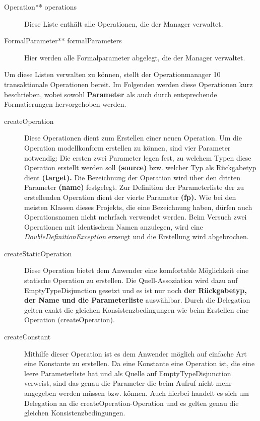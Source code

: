 \begin{description}
\item[Operation** operations] Diese Liste enthält alle Operationen, die der Manager verwaltet.
\item[FormalParameter** formalParameters] Hier werden alle Formalparameter abgelegt, die der Manager verwaltet.
\end{description}

Um diese Listen verwalten zu können, stellt der Operationmanager 10 transaktionale Operationen bereit.
Im Folgenden werden diese Operationen kurz beschrieben, wobei sowohl \textbf{Parameter} als auch  durch entsprechende Formatierungen hervorgehoben werden.

\begin{description}
\item[createOperation]
Diese Operationen dient zum Erstellen einer neuen Operation. Um die Operation modellkonform erstellen zu können, sind vier Parameter notwendig:
Die ersten zwei Parameter legen fest, zu welchem Typen diese Operation erstellt werden soll \textbf{(source)} bzw. welcher Typ als Rückgabetyp dient \textbf{(target).}
Die Bezeichnung der Operation wird über den dritten Parameter \textbf{(name)} festgelegt. 
Zur Definition der Parameterliste der zu erstellenden Operation dient der vierte Parameter \textbf{(fp).}
Wie bei den meisten Klassen dieses Projekts, die eine Bezeichnung haben, dürfen auch Operationsnamen nicht mehrfach verwendet werden. Beim Versuch zwei Operationen mit identischem Namen anzulegen, wird eine \emph{DoubleDefinitionException} erzeugt und die Erstellung wird abgebrochen.
\item[createStaticOperation]
Diese Operation bietet dem Anwender eine komfortable Möglichkeit eine statische Operation zu erstellen. Die Quell-Assoziation wird dazu auf EmptyTypeDisjunction gesetzt und es ist nur noch \textbf{der Rückgabetyp, der Name und die Parameterliste} auswählbar. Durch die Delegation gelten exakt die gleichen Konsistenzbedingungen wie beim Erstellen eine Operation (createOperation).
\item[createConstant]
Mithilfe dieser Operation ist es dem Anwender möglich auf einfache Art eine Konstante zu erstellen. Da eine Konstante eine Operation ist, die eine leere Parameterliste hat und als Quelle auf EmptyTypeDisjunction verweist, sind das genau die Parameter die beim Aufruf nicht mehr angegeben werden müssen bzw. können. Auch hierbei handelt es sich um Delegation an die createOperation-Operation und es gelten genau die gleichen Konsistenzbedingungen.

\end{description}
